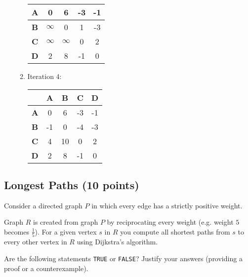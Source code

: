 \documentclass{article}
\begin{document}
\begin{enumerate}
\begin{enumerate}
\begin{tabular}{|c|c|c|c|c|}
            \hline
            \textbf{A} & 0 & 6 & -3 & -1 \\
            \hline
            \textbf{B} & $\infty$ & 0 & 1 & -3 \\
            \hline
            \textbf{C} & $\infty$ & $\infty$ & 0 & 2 \\
            \hline
            \textbf{D} & 2 & 8 & -1 & 0 \\
            \hline
        \end{tabular}
        \item Iteration 4:
        \begin{tabular}{|c|c|c|c|c|}
            \hline
            & \textbf{A} & \textbf{B} & \textbf{C} & \textbf{D} \\
            \hline
            \textbf{A} & 0 & 6 & -3 & -1 \\
            \hline
            \textbf{B} & -1 & 0 & -4 & -3 \\
            \hline
            \textbf{C} & 4 & 10 & 0 & 2 \\
            \hline
            \textbf{D} & 2 & 8 & -1 & 0 \\
            \hline
        \end{tabular}
    \end{enumerate}
     
\end{enumerate}

\subsection{Longest Paths (10 points)}

Consider a directed graph $P$ in which every edge has a strictly positive weight.

Graph $R$ is created from graph $P$ by reciprocating every weight (e.g. weight $5$ becomes $\frac{1}{5}$). For a given vertex $s$ in $R$ you compute all shortest paths from $s$ to every other vertex in $R$ using Dijkstra’s algorithm.

Are the following statements \texttt{TRUE} or \texttt{FALSE}? Justify your answers (providing a proof or a counterexample).
\end{document}
